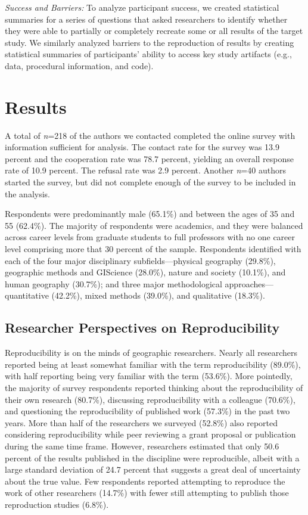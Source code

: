 \documentclass[]{interact}
\theoremstyle{plain}%
\theoremstyle{definition}
\theoremstyle{remark}
\begin{document}
\textit{Success and Barriers:} To analyze participant success, we created statistical summaries for a series of questions that asked researchers to identify whether they were able to partially or completely recreate some or all results of the target study. 
We similarly analyzed barriers to the reproduction of results by creating statistical summaries of participants' ability to access key study artifacts (e.g., data, procedural information, and code).

\section*{Results}
A total of \textit{n}=218 of the authors we contacted completed the online survey with information sufficient for analysis. 
The contact rate for the survey was 13.9 percent and the cooperation rate was 78.7 percent, yielding an overall response rate of 10.9 percent. 
The refusal rate was 2.9 percent.
Another \textit{n}=40 authors started the survey, but did not complete enough of the survey to be included in the analysis.

Respondents were predominantly male (65.1\%) and between the ages of 35 and 55 (62.4\%). 
The majority of respondents were academics, and they were balanced across career levels from graduate students to full professors with no one career level comprising more that 30 percent of the sample.
Respondents identified with each of the four major disciplinary subfields---physical geography (29.8\%), geographic methods and GIScience (28.0\%), nature and society (10.1\%), and human geography (30.7\%); and three major methodological approaches---quantitative (42.2\%), mixed methods (39.0\%), and qualitative (18.3\%).

\subsection*{Researcher Perspectives on Reproducibility}
Reproducibility is on the minds of geographic researchers.
Nearly all researchers reported being at least somewhat familiar with the term reproducibility (89.0\%), with half reporting being very familiar with the term (53.6\%).
More pointedly, the majority of survey respondents reported thinking about the reproducibility of their own research (80.7\%), discussing reproducibility with a colleague (70.6\%), and questioning the reproducibility of published work (57.3\%) in the past two years. 
More than half of the researchers we surveyed (52.8\%) also reported considering reproducibility while peer reviewing a grant proposal or publication during the same time frame. 
However, researchers estimated that only 50.6 percent of the results published in the discipline were reproducible, albeit with a large standard deviation of 24.7 percent that suggests a great deal of uncertainty about the true value. 
Few respondents reported attempting to reproduce the work of other researchers (14.7\%) with fewer still attempting to publish those reproduction studies (6.8\%). 
\end{document}
